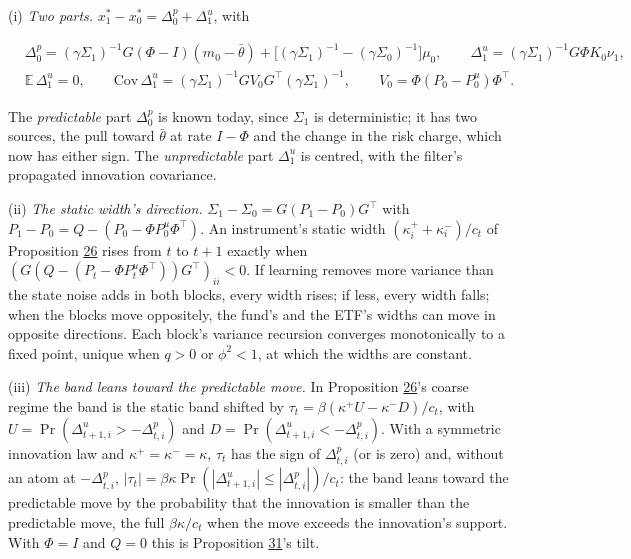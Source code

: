 \documentclass[11pt]{article}
\begin{document}
(i) \emph{Two parts.} \(x^*_1-x^*_0=\Delta^p_0+\Delta^u_1\), with

\begin{equation*}
\begin{aligned}
&\Delta^p_0=(\gamma\Sigma_1)^{-1}G(\Phi-I)(m_0-\bar\theta)+\bigl[(\gamma\Sigma_1)^{-1}-(\gamma\Sigma_0)^{-1}\bigr]\mu_0,\qquad
\Delta^u_1=(\gamma\Sigma_1)^{-1}G\Phi K_0\nu_1,\\
&\mathbb E\,\Delta^u_1=0,\qquad
\mathrm{Cov}\,\Delta^u_1=(\gamma\Sigma_1)^{-1}GV_0G^\top(\gamma\Sigma_1)^{-1},\qquad V_0=\Phi(P_0-P^u_0)\Phi^\top.
\end{aligned}\tag{179}\label{eq:179}
\end{equation*}

The \emph{predictable} part \(\Delta^p_0\) is known today, since \(\Sigma_1\) is deterministic;
it has two sources, the pull toward \(\bar\theta\) at rate \(I-\Phi\) and the change in
the risk charge, which now has either sign. The \emph{unpredictable} part \(\Delta^u_1\)
is centred, with the filter's propagated innovation covariance.

(ii) \emph{The static width's direction.} \(\Sigma_1-\Sigma_0=G(P_1-P_0)G^\top\) with
\(P_1-P_0=Q-(P_0-\Phi P^u_0\Phi^\top)\). An instrument's static width \((\kappa^+_i+\kappa^-_i)/c_t\) of
Proposition \hyperref[res:Proposition-26]{26} rises from \(t\) to \(t+1\) exactly when
\((G(Q-(P_t-\Phi P^u_t\Phi^\top))G^\top)_{ii}<0\). If learning removes more variance than the
state noise adds in both blocks, every width rises; if less, every
width falls; when the blocks move oppositely, the fund's and the ETF's
widths can move in opposite directions. Each block's variance recursion
converges monotonically to a fixed point, unique when \(q>0\) or \(\phi^2<1\), at
which the widths are constant.

(iii) \emph{The band leans toward the predictable move.} In Proposition \hyperref[res:Proposition-26]{26}'s
coarse regime the band is the static band shifted by
\(\tau_t=\beta(\kappa^+U-\kappa^-D)/c_t\), with \(U=\Pr(\Delta^u_{t+1,i}>-\Delta^p_{t,i})\) and \(D=\Pr(\Delta^u_{t+1,i}<-\Delta^p_{t,i})\).
With a symmetric innovation law and \(\kappa^+=\kappa^-=\kappa\), \(\tau_t\) has the sign of \(\Delta^p_{t,i}\)
(or is zero) and, without an atom at \(-\Delta^p_{t,i}\),
\(|\tau_t|=\beta\kappa\Pr(|\Delta^u_{t+1,i}|\leq|\Delta^p_{t,i}|)/c_t\): the band leans toward the predictable
move by the probability that the innovation is smaller than the
predictable move, the full \(\beta\kappa/c_t\) when the move exceeds the innovation's support. With \(\Phi=I\)
and \(Q=0\) this is Proposition \hyperref[res:Proposition-31]{31}'s tilt.
\end{document}
